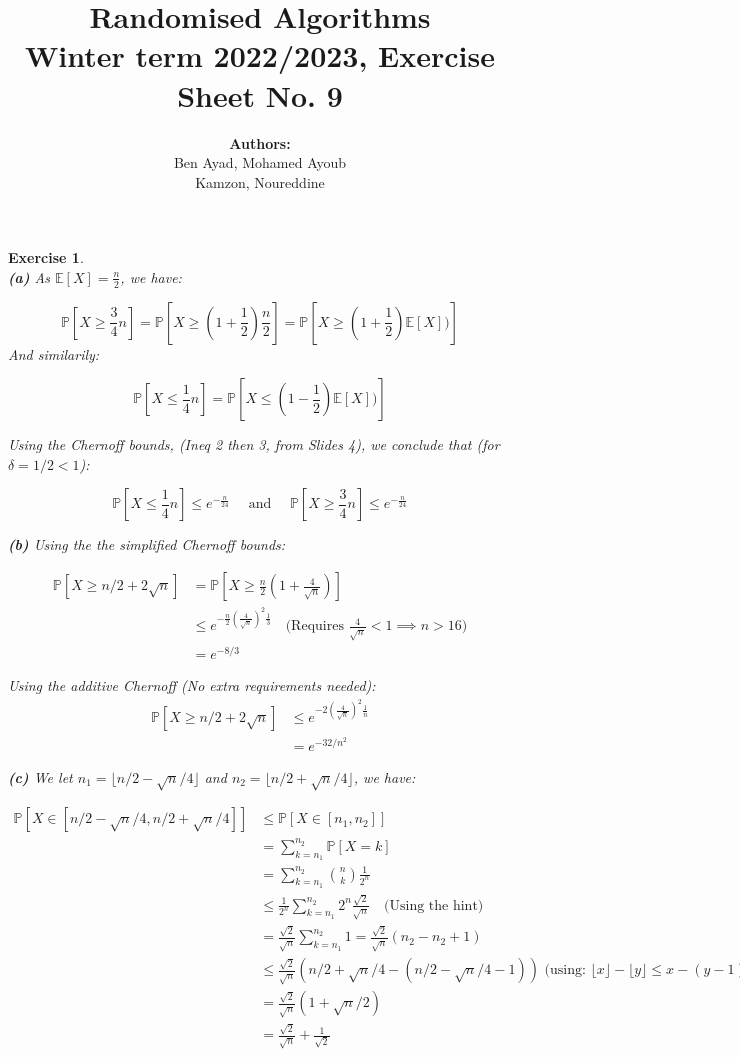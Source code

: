 \documentclass{article}
\title{Randomised Algorithms \\
Winter term 2022/2023, Exercise Sheet No. 9}
\author{
    \textbf{Authors:} \\
    Ben Ayad, Mohamed Ayoub \\
    Kamzon, Noureddine
}
\newcommand{\floor}[1]{\lfloor #1 \rfloor}
\newtheorem{exo}{Exercise}
\def\P{\mathbb{P}}
\def\E{\mathbb{E}}
\begin{document}
\maketitle

\begin{exo}{\ \\}
\noindent
\textbf{(a)} As $\E[X] = \frac{n}{2}$, we have:

\[\P[X \geq \frac{3}{4} n] 
    =  \P[X \geq (1 + \frac{1}{2}) \frac{n}{2}] 
    = \P[X \geq (1+\frac{1}{2}) \E[X])]\]
And similarily:

\[\P[X \leq \frac{1}{4} n] 
    = \P[X \leq (1-\frac{1}{2}) \E[X])]\]

Using the Chernoff bounds, (Ineq 2 then 3, from Slides 4), we conclude that (for $\delta = 1/2 <  1$):

\[
\P[X \leq \frac{1}{4} n] \leq e^{-\frac{n}{24}}
\quad \text{ and }  \quad
\P[X \geq \frac{3}{4} n] \leq  e^{-\frac{n}{24}}
\]

\noindent
\textbf{(b)} Using the the simplified Chernoff bounds:

\begin{align*}
\P[X \geq n/2 +2\sqrt{n}]   
&= \P[X \geq \frac{n}{2}(1 + \frac{4}{\sqrt{n}})] \\
&\leq e^{ - \frac{n}{2} \left( \frac{4}{\sqrt{n}} \right)^2 \frac{1}{3}} 
\quad \text{(Requires $\frac{4}{\sqrt{n}} < 1 \implies n > 16$)}
\\
&= e^{-8/3}
\end{align*}

Using the additive Chernoff (No extra requirements needed):
\begin{align*}
\P[X \geq n/2 +2\sqrt{n}]   
&\leq e^{-2 \left(\frac{4}{\sqrt{n}}\right)^2 \frac{1}{n}}\\
&= e^{-32/n^2}
\end{align*}

\noindent
\textbf{(c)} We let $n_1 = \floor{n/2 - \sqrt{n}/4}$ and $n_2 = \floor{n/2 + \sqrt{n}/4}$, we have:

\begin{align*}
    \P[X \in [n/2 - \sqrt{n}/4, n/2 + \sqrt{n}/4]]
    &\leq \P[X \in [n_1, n_2]] \\
    &= \sum^{n_2}_{k=n_1} \P[X = k] \\
    &= \sum^{n_2}_{k = n_1} \binom{n}{k} \frac{1}{2^n} \\
    &\leq \frac{1}{2^n} \sum^{n_2}_{k = n_1} 2^n \frac{\sqrt{2}}{\sqrt{n}}  
    \quad \text{(Using the hint)}
    \\
    &= \frac{\sqrt{2}}{\sqrt{n}} \sum^{n_2}_{k=n_1} 1  
    = \frac{\sqrt{2}}{\sqrt{n}} (n_2 - n_2 +1) \\
    &\leq \frac{\sqrt{2}}{\sqrt{n}}  
    \left(n/2 + \sqrt{n}/4 - (n/2 - \sqrt{n}/4 - 1)\right) 
    \text{ (using: $\floor{x}-\floor{y} \leq x-(y-1)$)}
    \\
    &= \frac{\sqrt{2}}{\sqrt{n}} (1 + \sqrt{n}/2)\\
    &= \frac{\sqrt{2}}{\sqrt{n}}  + \frac{1}{\sqrt{2}} 
\end{align*}


\end{exo}
\end{document}
